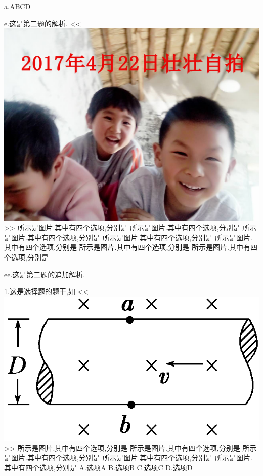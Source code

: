 \documentclass[a4paper,fontset = windowsnew]{ctexart}
\begin{document}
\begin{choices}
  a.ABCD

  e.这是第二题的解析.
  <<
  \includegraphics[scale=0.2]{2.jpg}
  >>
  所示是图片.其中有四个选项,分别是
  所示是图片.其中有四个选项,分别是
  所示是图片.其中有四个选项,分别是
  所示是图片.其中有四个选项,分别是
  所示是图片.其中有四个选项,分别是
  所示是图片.其中有四个选项,分别是
  所示是图片.其中有四个选项,分别是

  ee.这是第二题的追加解析.

  1.这是选择题的题干,如
  <<
  \includegraphics{1.png}
  >>
  所示是图片.其中有四个选项,分别是
  所示是图片.其中有四个选项,分别是
  所示是图片.其中有四个选项,分别是
  所示是图片.其中有四个选项,分别是
  所示是图片.其中有四个选项,分别是
  A.选项A
  B.选项B
  C.选项C
  D.选项D

\end{choices}
\end{document}
